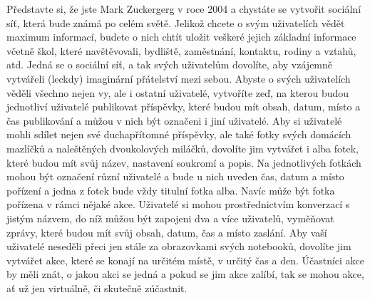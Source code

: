 \documentclass{article}
\begin{document}
Představte si, že jste Mark Zuckergerg v roce 2004 a chystáte se vytvořit sociální síť, která bude známá po celém světě. Jelikož chcete o svým uživatelích vědět maximum informací, budete o nich chtít uložit veškeré jejich základní informace včetně škol, které navštěvovali, bydliště, zaměstnání, kontaktu, rodiny a vztahů, atd. Jedná se o sociální síť, a tak svých uživatelům dovolíte, aby vzájemně vytvářeli (leckdy) imaginární přátelství mezi sebou. Abyste o svých uživatelích věděli všechno nejen vy, ale i ostatní uživatelé, vytvoříte zeď, na kterou budou jednotliví uživatelé publikovat příspěvky, které budou mít obsah, datum, místo a čas publikování a můžou v nich být označeni i jiní uživatelé. Aby si uživatelé mohli sdílet nejen své duchapřítomné příspěvky, ale také fotky svých domácích mazlíčků a naleštěných dvoukolových miláčků, dovolíte jim vytvářet i alba fotek, které budou mít svůj název, nastavení soukromí a popis. Na jednotlivých fotkách mohou být označení různí uživatelé a bude u nich uveden čas, datum a místo pořízení a jedna z fotek bude vždy titulní fotka alba. Navíc může být fotka pořízena v rámci nějaké akce. Uživatelé si mohou prostřednictvím konverzací s jistým názvem, do níž můžou být zapojeni dva a více uživatelů, vyměňovat zprávy, které budou mít svůj obsah, datum, čas a místo zaslání. Aby vaší uživatelé neseděli přeci jen stále za obrazovkami svých notebooků, dovolíte jim vytvářet akce, které se konají na určitém místě, v určitý čas a den. Účastníci akce by měli znát, o jakou akci se jedná a pokud se jim akce zalíbí, tak se mohou akce, ať už jen virtuálně, či skutečně zúčastnit.

\end{document}
